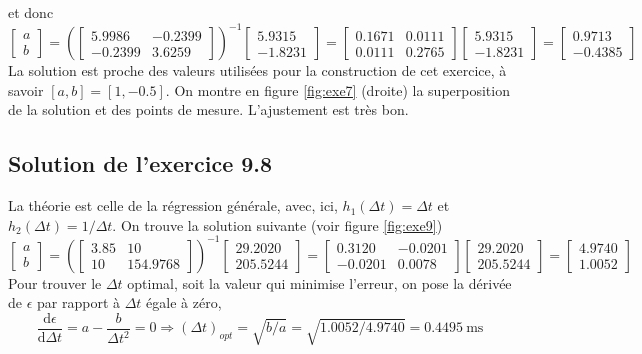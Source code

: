et donc
\begin{equation*}
\begin{bmatrix} a \\ b \end{bmatrix}=
\left(\begin{bmatrix}
    5.9986 &  -0.2399 \\
   -0.2399 &   3.6259
\end{bmatrix}\right)^{-1}
\begin{bmatrix} 5.9315 \\ -1.8231 \end{bmatrix}=
\begin{bmatrix}
0.1671 & 0.0111 \\
0.0111 & 0.2765
\end{bmatrix}
\begin{bmatrix} 5.9315 \\ -1.8231 \end{bmatrix}=
\begin{bmatrix} 0.9713 \\ -0.4385 \end{bmatrix}
\end{equation*}
La solution est proche des valeurs utilisées pour la construction de cet exercice, à savoir $[a,b]=[1,-0.5]$. On montre en figure \ref{fig:exe7} (droite) la superposition de la solution et des points de mesure. L'ajustement est très bon.

\subsection*{Solution de l'exercice 9.8}

La théorie est celle de la régression générale, avec, ici, $h_1(\Delta t)=\Delta t$ et $h_2(\Delta t)=1/\Delta t$. On trouve la solution suivante (voir figure \ref{fig:exe9})
\begin{equation*}
\begin{bmatrix} a \\ b \end{bmatrix}=
\left(\begin{bmatrix}
3.85 & 10 \\
  10 & 154.9768
\end{bmatrix}\right)^{-1}
\begin{bmatrix} 29.2020 \\ 205.5244 \end{bmatrix}=
\begin{bmatrix}
    0.3120 &  -0.0201 \\
   -0.0201 &   0.0078
\end{bmatrix}
\begin{bmatrix} 29.2020 \\ 205.5244 \end{bmatrix}=
\begin{bmatrix} 4.9740 \\ 1.0052 \end{bmatrix}
\end{equation*}
Pour trouver le $\Delta t$ optimal, soit la valeur qui minimise l'erreur, on pose la dérivée de $\epsilon$ par rapport à $\Delta t$ égale à zéro,
$$
\frac{\text{d}\epsilon}{\text{d}\Delta t}=a-\frac{b}{\Delta t^2}=0\Longrightarrow
(\Delta t)_{opt}=\sqrt{b/a}=\sqrt{1.0052/4.9740}=0.4495\ \text{ms}
$$
